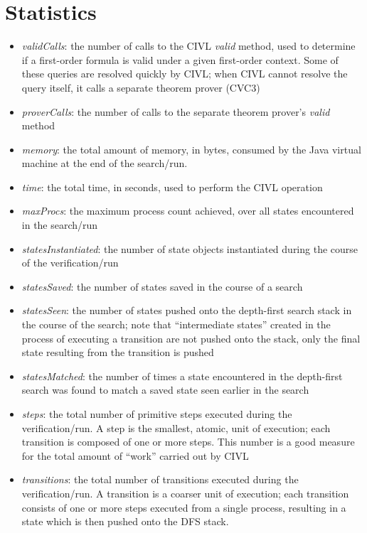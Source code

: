\section{Statistics}

\begin{itemize}
\item \emph{validCalls}: the number of calls to the CIVL \emph{valid}
  method, used to determine if a first-order formula is valid under
  a given first-order context.   Some of these queries are resolved
  quickly by CIVL; when CIVL cannot resolve the query itself, it
  calls a separate theorem prover (CVC3)
\item \emph{proverCalls}: the number of calls to the separate theorem
  prover's \emph{valid} method
\item \emph{memory}: the total amount of memory, in bytes, consumed by
  the Java virtual machine at the end of the search/run.
\item \emph{time}: the total time, in seconds, used to perform the
  CIVL operation
\item \emph{maxProcs}: the maximum process count achieved, over all states 
  encountered in the search/run
\item \emph{statesInstantiated}: the number of state objects
  instantiated during the course of the verification/run
\item \emph{statesSaved}: the number of states saved in the course
  of a search
\item \emph{statesSeen}: the number of states pushed onto the 
  depth-first search stack in the course of the search; note
  that ``intermediate states'' created in the process of executing
  a transition are not pushed onto the stack, only the final
  state resulting from the transition is pushed
\item \emph{statesMatched}: the number of times a state encountered
  in the depth-first search was found to match a saved state seen
  earlier in the search
\item \emph{steps}: the total number of primitive steps executed
  during the verification/run.  A step is the smallest, atomic,
  unit of execution; each transition is composed of one or more steps.
  This number is a good measure for the total amount of ``work''
  carried out by CIVL
\item \emph{transitions}: the total number of transitions executed
  during the verification/run.  A transition is a coarser unit
  of execution; each transition consists of one or more steps 
  executed from a single process, resulting in a state which is then
  pushed onto the DFS stack.
\end{itemize}

